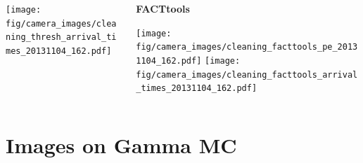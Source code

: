 \begin{withoutheadline}
\begin{frame}{}
\begin{columns}[onlytextwidth]
\begin{column}{0.33\textwidth}
        \texttt{[image: fig/camera\_images/cleaning\_thresh\_arrival\_times\_20131104\_162.pdf]}
      \end{column}
    \hfill%
      \begin{column}{0.33\textwidth}
          \centering
        \textbf{FACTtools}\par\medskip
        \texttt{[image: fig/camera\_images/cleaning\_facttools\_pe\_20131104\_162.pdf]}
        \texttt{[image: fig/camera\_images/cleaning\_facttools\_arrival\_times\_20131104\_162.pdf]}
      \end{column}
    \end{columns}
  \end{frame}
\end{withoutheadline}

\section{Images on Gamma MC}


